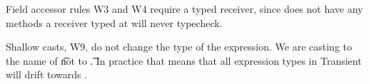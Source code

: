 \documentclass[a4paper,USenglish]{tex/lipics-v2016}
\begin{document}
Field accessor rules W3 and W4 require a typed receiver, since \any does
not have any methods a receiver typed at \any will never typecheck.

Shallow casts, W9, do not change the type of the expression. We are casting
to the name of \t not to \t.  In practice that means that all expression
types in Transient will drift towards \any.

~\\

\begin{mathpar}












\end{mathpar}
\end{document}
